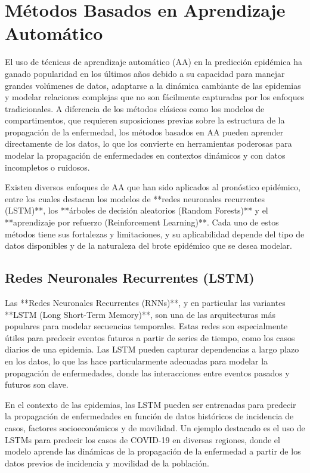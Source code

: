 \section{Métodos Basados en Aprendizaje Automático}\label{section:machine-learning-methods}

El uso de técnicas de aprendizaje automático (AA) en la predicción epidémica ha ganado popularidad en los últimos años debido a su capacidad para manejar grandes volúmenes de datos, adaptarse a la dinámica cambiante de las epidemias y modelar relaciones complejas que no son fácilmente capturadas por los enfoques tradicionales. A diferencia de los métodos clásicos como los modelos de compartimentos, que requieren suposiciones previas sobre la estructura de la propagación de la enfermedad, los métodos basados en AA pueden aprender directamente de los datos, lo que los convierte en herramientas poderosas para modelar la propagación de enfermedades en contextos dinámicos y con datos incompletos o ruidosos.

Existen diversos enfoques de AA que han sido aplicados al pronóstico epidémico, entre los cuales destacan los modelos de **redes neuronales recurrentes (LSTM)**, los **árboles de decisión aleatorios (Random Forests)** y el **aprendizaje por refuerzo (Reinforcement Learning)**. Cada uno de estos métodos tiene sus fortalezas y limitaciones, y su aplicabilidad depende del tipo de datos disponibles y de la naturaleza del brote epidémico que se desea modelar.

\subsection{Redes Neuronales Recurrentes (LSTM)}

Las **Redes Neuronales Recurrentes (RNNs)**, y en particular las variantes **LSTM (Long Short-Term Memory)**, son una de las arquitecturas más populares para modelar secuencias temporales. Estas redes son especialmente útiles para predecir eventos futuros a partir de series de tiempo, como los casos diarios de una epidemia. Las LSTM pueden capturar dependencias a largo plazo en los datos, lo que las hace particularmente adecuadas para modelar la propagación de enfermedades, donde las interacciones entre eventos pasados y futuros son clave.

En el contexto de las epidemias, las LSTM pueden ser entrenadas para predecir la propagación de enfermedades en función de datos históricos de incidencia de casos, factores socioeconómicos y de movilidad. Un ejemplo destacado es el uso de LSTMs para predecir los casos de COVID-19 en diversas regiones, donde el modelo aprende las dinámicas de la propagación de la enfermedad a partir de los datos previos de incidencia y movilidad de la población. 

